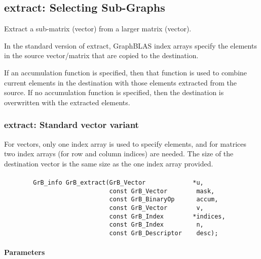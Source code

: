 \subsection{{\sf extract}: Selecting Sub-Graphs}
\label{Sec:extract}

Extract a sub-matrix (vector) from a larger matrix (vector). 

In the standard version of {\sf extract}, GraphBLAS index arrays
specify the elements in the source vector/matrix that are copied to
the destination. 

If an accumulation function is specified, then that function is
used to combine current elements in the destination with those elements
extracted from the source. If no accumulation function is specified, then
the destination is overwritten with the extracted elements.  


\subsubsection{{\sf extract}: Standard vector variant}

For vectors, only one index array is used to specify
elements, and for matrices two index arrays (for row and column indices)
are needed.  The size of the destination vector is the same size as
the one index array provided.  

\paragraph{\syntax}

\begin{verbatim}
        GrB_info GrB_extract(GrB_Vector             *u,
                             const GrB_Vector        mask,
                             const GrB_BinaryOp      accum,
                             const GrB_Vector        v,
                             const GrB_Index        *indices,
                             const GrB_Index         n,
                             const GrB_Descriptor    desc);
\end{verbatim}

\paragraph{Parameters}

